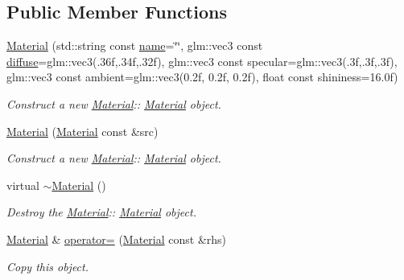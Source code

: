\subsection*{Public Member Functions}
\begin{DoxyCompactItemize}
\item 
\hyperlink{class_material_a49691a0a92cc3e571869f2b494f8cd5d}{Material} (std\+::string const \hyperlink{class_material_affe06990f884293d0fe2f39110f71730}{name}=\char`\"{}\char`\"{}, glm\+::vec3 const \hyperlink{class_material_a099904e2f5a7bbec3cba6bf8ec546b11}{diffuse}=glm\+::vec3(.\+36f,.\+34f,.\+32f), glm\+::vec3 const specular=glm\+::vec3(.\+3f,.\+3f,.\+3f), glm\+::vec3 const ambient=glm\+::vec3(0.\+2f, 0.\+2f, 0.\+2f), float const shininess=16.\+0f)
\begin{DoxyCompactList}\small\item\em Construct a new \hyperlink{class_material}{Material}\+:\+: \hyperlink{class_material}{Material} object. \end{DoxyCompactList}\item 
\hyperlink{class_material_a611dba609ac416f5f59c325c4611c964}{Material} (\hyperlink{class_material}{Material} const \&src)
\begin{DoxyCompactList}\small\item\em Construct a new \hyperlink{class_material}{Material}\+:\+: \hyperlink{class_material}{Material} object. \end{DoxyCompactList}\item 
\mbox{\label{class_material_a2c19452d71f54075df8f5405b03129f4}} 
virtual \hyperlink{class_material_a2c19452d71f54075df8f5405b03129f4}{$\sim$\+Material} ()
\begin{DoxyCompactList}\small\item\em Destroy the \hyperlink{class_material}{Material}\+:\+: \hyperlink{class_material}{Material} object. \end{DoxyCompactList}\item 
\hyperlink{class_material}{Material} \& \hyperlink{class_material_af2f8251a70528e05331dc8dfac025487}{operator=} (\hyperlink{class_material}{Material} const \&rhs)
\begin{DoxyCompactList}\small\item\em Copy this object. \end{DoxyCompactList}\end{DoxyCompactItemize}

